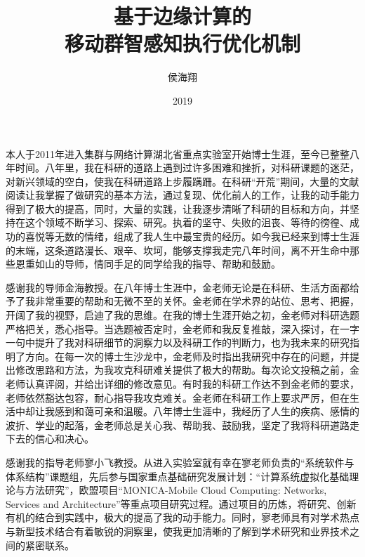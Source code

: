 \documentclass[format=draft,language=chinese,degree=phd,table,usenames,dvipsnames]{hustthesis}
\title{基于边缘计算的\\移动群智感知执行优化机制}{Execution Optimization Mechanisms for \protect{\\} Edge Computing empowered Mobile Crowdsensing}
\author{侯海翔}{Haixiang Hou}
\date{2019}{6}{1}
\begin{document}
\frontmatter
\maketitle
\makeabstract
\tableofcontents
\listoffigures
\listoftables
\mainmatter













\begin{ack}

本人于2011年进入集群与网络计算湖北省重点实验室开始博士生涯，至今已整整八年时间。八年里，我在科研的道路上遇到过许多困难和挫折，对科研课题的迷茫，对新兴领域的空白，使我在科研道路上步履蹒跚。在科研“开荒”期间，大量的文献阅读让我掌握了做研究的基本方法，通过复现、优化前人的工作，让我的动手能力得到了极大的提高，同时，大量的实践，让我逐步清晰了科研的目标和方向，并坚持在这个领域不断学习、探索、研究。执着的坚守、失败的沮丧、等待的徬徨、成功的喜悦等无数的情绪，组成了我人生中最宝贵的经历。如今我已经来到博士生涯的末端，这条道路漫长、艰辛、坎坷，能够支撑我走完八年时间，离不开生命中那些恩重如山的导师，情同手足的同学给我的指导、帮助和鼓励。

感谢我的导师金海教授。在八年博士生涯中，金老师无论是在科研、生活方面都给予了我非常重要的帮助和无微不至的关怀。金老师在学术界的站位、思考、把握，开阔了我的视野，启迪了我的思维。在我的博士生涯开始之初，金老师对科研选题严格把关，悉心指导。当选题被否定时，金老师和我反复推敲，深入探讨，在一字一句中提升了我对科研细节的洞察力以及科研工作的判断力，也为我未来的研究指明了方向。在每一次的博士生沙龙中，金老师及时指出我研究中存在的问题，并提出修改思路和方法，为我攻克科研难关提供了极大的帮助。每次论文投稿之前，金老师认真评阅，并给出详细的修改意见。有时我的科研工作达不到金老师的要求，老师依然豁达包容，耐心指导我攻克难关。金老师在科研工作上要求严厉，但在生活中却让我感到和蔼可亲和温暖。八年博士生涯中，我经历了人生的疾病、感情的波折、学业的起落，金老师总是关心我、帮助我、鼓励我，坚定了我将科研道路走下去的信心和决心。

感谢我的指导老师寥小飞教授。从进入实验室就有幸在寥老师负责的“系统软件与体系结构”课题组，先后参与国家重点基础研究发展计划：“计算系统虚拟化基础理论与方法研究”，欧盟项目“MONICA-Mobile Cloud Computing: Networks, Services and Architecture”等重点项目研究过程。通过项目的历炼，将研究、创新有机的结合到实践中，极大的提高了我的动手能力。同时，寥老师具有对学术热点与新型技术结合有着敏锐的洞察里，使我更加清晰的了解到学术研究和业界技术之间的紧密联系。


\end{ack}
\end{document}
